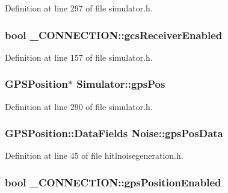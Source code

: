 \-Definition at line 297 of file simulator.\-h.

\hypertarget{group___h_i_t_l_plugin_ga2e4de2a270dafeeadda687a7fc6fb817}{
\subsubsection[{gcs\-Receiver\-Enabled}]{\setlength{\rightskip}{0pt plus 5cm}bool {\bf \-\_\-\-C\-O\-N\-N\-E\-C\-T\-I\-O\-N\-::gcs\-Receiver\-Enabled}}}\label{group___h_i_t_l_plugin_ga2e4de2a270dafeeadda687a7fc6fb817}


\-Definition at line 157 of file simulator.\-h.

\hypertarget{group___h_i_t_l_plugin_gae4d6ea654494f0de351686d9c35037ca}{
\subsubsection[{gps\-Pos}]{\setlength{\rightskip}{0pt plus 5cm}\-G\-P\-S\-Position$\ast$ {\bf \-Simulator\-::gps\-Pos}}}\label{group___h_i_t_l_plugin_gae4d6ea654494f0de351686d9c35037ca}


\-Definition at line 290 of file simulator.\-h.

\hypertarget{group___h_i_t_l_plugin_ga9ec5e3f5256aa25ca8a8556643eb355d}{
\subsubsection[{gps\-Pos\-Data}]{\setlength{\rightskip}{0pt plus 5cm}\-G\-P\-S\-Position\-::\-Data\-Fields {\bf \-Noise\-::gps\-Pos\-Data}}}\label{group___h_i_t_l_plugin_ga9ec5e3f5256aa25ca8a8556643eb355d}


\-Definition at line 45 of file hitlnoisegeneration.\-h.

\hypertarget{group___h_i_t_l_plugin_gaec1f5b5cc3ce18186907fde4c9c990b3}{
\subsubsection[{gps\-Position\-Enabled}]{\setlength{\rightskip}{0pt plus 5cm}bool {\bf \-\_\-\-C\-O\-N\-N\-E\-C\-T\-I\-O\-N\-::gps\-Position\-Enabled}}}\label{group___h_i_t_l_plugin_gaec1f5b5cc3ce18186907fde4c9c990b3}


